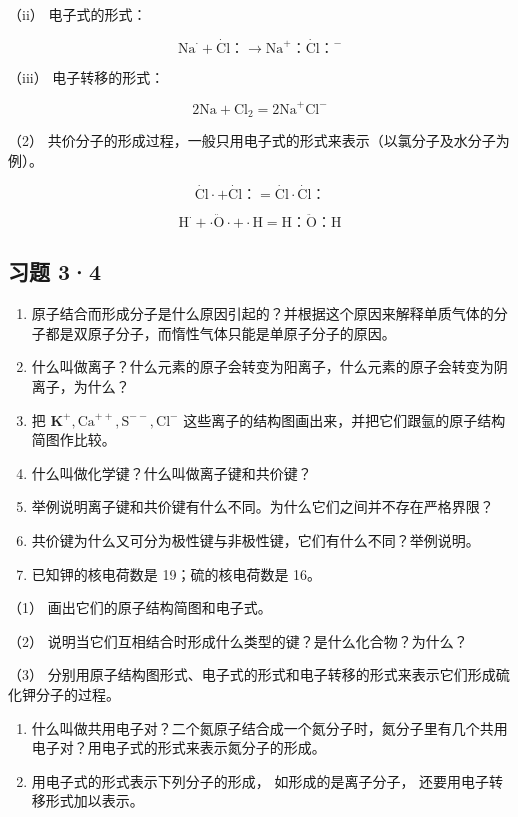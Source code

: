 （ii） 电子式的形式：

\[
\mathrm{Na} ^ {\cdot} + \dot {\mathrm{Cl}}\text{：} \longrightarrow \mathrm{Na} ^ {+}\text{：} \dot {\mathrm{Cl}}\text{：} ^ {-}
\]

（iii） 电子转移的形式：

\[
2 \mathrm{Na} + \mathrm{Cl} _ {2} = 2 \mathrm{Na} ^ {+} \mathrm{Cl} ^ {-}
\]

（2）
共价分子的形成过程，一般只用电子式的形式来表示（以氯分子及水分子为例）。

\[
\dot {\mathrm{Cl}} \cdot + \dot {\mathrm{Cl}} \text{：}= \dot {\mathrm{Cl}} \cdot \dot {\mathrm{Cl}}\text{：}
\]

\[
\mathrm{H} ^ {\cdot} + \cdot \ddot {\mathrm{O}} \cdot + \cdot \mathrm{H} = \mathrm{H}\text{：} \ddot {\mathrm{O}}\text{：} \mathrm{H}
\]

\subsection{习题 3·4}

\begin{enumerate}
\item
  原子结合而形成分子是什么原因引起的？并根据这个原因来解释单质气体的分子都是双原子分子，而惰性气体只能是单原子分子的原因。
\item
  什么叫做离子？什么元素的原子会转变为阳离子，什么元素的原子会转变为阴离子，为什么？
\item
  把
  \(\mathbf{K}^{+}, \mathrm{Ca}^{++}, \mathrm{S}^{--}, \mathrm{Cl}^{-}\)
  这些离子的结构图画出来，并把它们跟氩的原子结构简图作比较。
\item
  什么叫做化学键？什么叫做离子键和共价键？
\item
  举例说明离子键和共价键有什么不同。为什么它们之间并不存在严格界限？
\item
  共价键为什么又可分为极性键与非极性键，它们有什么不同？举例说明。
\item
  已知钾的核电荷数是 19；硫的核电荷数是 16。
\end{enumerate}

（1） 画出它们的原子结构简图和电子式。

（2） 说明当它们互相结合时形成什么类型的键？是什么化合物？为什么？

（3）
分别用原子结构图形式、电子式的形式和电子转移的形式来表示它们形成硫化钾分子的过程。

\begin{enumerate}[start=8]
\item
  什么叫做共用电子对？二个氮原子结合成一个氮分子时，氮分子里有几个共用电子对？用电子式的形式来表示氮分子的形成。
\item
  用电子式的形式表示下列分子的形成， 如形成的是离子分子，
  还要用电子转移形式加以表示。
\end{enumerate}

